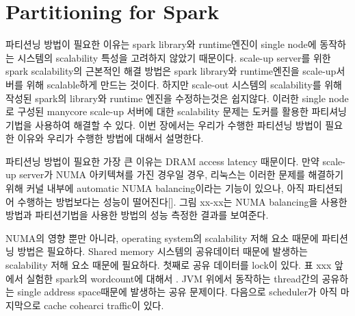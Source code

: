 \section{Partitioning for Spark}
\ifkor
파티션닝 방법이 필요한 이유는 spark library와 runtime엔진이 single node에 동작하는 
시스템의 scalability 특성을 고려하지 않았기 때문이다. 
scale-up server를 위한 spark scalability의 근본적인 해결 방법은 spark library와 
runtime엔진을 scale-up서버를 위해 scalable하게 만드는 것이다.
하지만 scale-out 시스템의 scalability를 위해 작성된 spark의 library와 runtime 엔진을 
수정하는것은 쉽지않다.
이러한 single node로 구성된 manycore scale-up 서버에 대한 scalability
문제는 도커를 활용한 파티셔닝 기법을 사용하여 해결할 수 있다.
이번 장에서는 우리가 수행한 파티션닝 방법이 필요한 이유와 우리가 수행한 방법에 대해서 설명한다.
\else

\fi

\ifkor
파티션닝 방법이 필요한 가장 큰 이유는 DRAM access latency 때문이다. 
만약 scale-up server가 NUMA 아키텍쳐를 가진 경우일 경우, 
리눅스는 이러한 문제를 해결하기 위해 커널 내부에 automatic NUMA balancing이라는 기능이 있으나, 
아직 파티션되어 수행하는 방법보다는 성능이 떨어진다[]. 그림 xx-xx는 NUMA balancing을 
사용한 방법과 파티션기법을 사용한 방법의 성능 측정한 결과를 보여준다. 
\else

\fi

\ifkor
NUMA의 영향 뿐만 아니라, operating system의 scalability 저해 요소 때문에 파티션닝 방법은 필요하다.
Shared memory 시스템의 공유데이터 때문에 발생하는 scalability 저해 요소 때문에 필요하다.
첫째로 공유 데이터를 lock이 있다. 표 xxx 앞에서 실험한 spark의 wordcount에 대해서 .
JVM 위에서 동작하는 thread간의 공유하는 single address space때문에 발생하는 공유 문제이다.
다음으로 scheduler가 아직 
마지막으로 cache cohearci traffic이 있다. 

